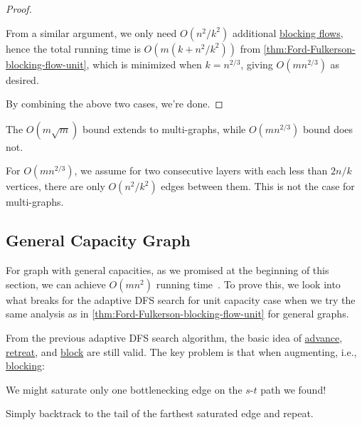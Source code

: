 \begin{proof}
\begin{explanation}
		From a similar argument, we only need \(O(n^2 / k^2)\) additional \hyperref[def:blocking-flow]{blocking flows}, hence the total running time is \(O(m (k + n^2 / k^2))\) from \autoref{thm:Ford-Fulkerson-blocking-flow-unit}, which is minimized when \(k = n^{2 / 3}\), giving \(O(mn^{2 / 3})\) as desired.
	\end{explanation}

	By combining the above two cases, we're done.
\end{proof}

\begin{remark}
	The \(O(m \sqrt{m} )\) bound extends to multi-graphs, while \(O(mn^{2 / 3})\) bound does not.
\end{remark}
\begin{explanation}
	For \(O(mn^{2 / 3})\), we assume for two consecutive layers with each less than \(2n / k\) vertices, there are only \(O(n^2 / k^2)\) edges between them. This is not the case for multi-graphs.
\end{explanation}

\subsection{General Capacity Graph}
For graph with general capacities, as we promised at the beginning of this section, we can achieve \(O(mn^2)\) running time~\cite{karzanov1973finding,dinic1970algorithm,goldberg1998beyond}. To prove this, we look into what breaks for the adaptive DFS search for unit capacity case when we try the same analysis as in \autoref{thm:Ford-Fulkerson-blocking-flow-unit} for general graphs.

From the previous adaptive DFS search algorithm, the basic idea of \hyperref[algo:unit-adaptive-DFS-advance]{advance}, \hyperref[algo:unit-adaptive-DFS-retreat]{retreat}, and \hyperref[algo:unit-adaptive-DFS-block]{block} are still valid. The key problem is that when augmenting, i.e., \hyperref[algo:unit-adaptive-DFS-block]{blocking}:

\begin{problem*}
	We might saturate only one bottlenecking edge on the \(s\)-\(t\) path we found!
\end{problem*}
\begin{answer}
	Simply backtrack to the tail of the farthest saturated edge and repeat.
\end{answer}

